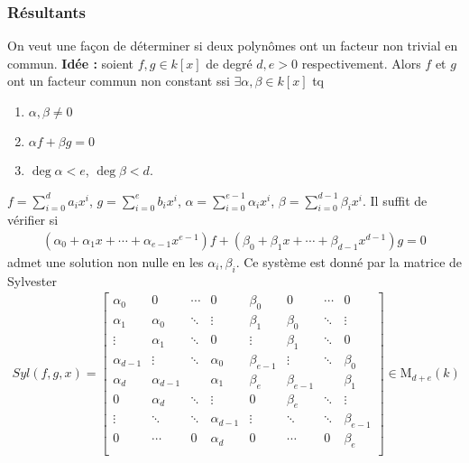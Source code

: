             \subsubsection{Résultants}
                On veut une façon de déterminer si deux polynômes ont un facteur non trivial en commun. \textbf{Idée :} soient $f,g \in k[x]$ de degré $d,e > 0$ respectivement. Alors $f$ et $g$ ont un facteur commun non constant ssi $\exists \alpha, \beta \in k[x]$ tq 
                \begin{enumerate}
                    \item $\alpha, \beta \neq 0$
                    \item $\alpha f + \beta g = 0$
                    \item $\deg \alpha < e$, $\deg \beta < d$.
                \end{enumerate}
                $f = \sum_{i = 0}^d a_ix^i$, $g = \sum_{i = 0}^e b_i x^i$, $\alpha = \sum_{i = 0}^{e-1} \alpha_i x^i$, $\beta = \sum_{i = 0}^{d-1} \beta_i x^i$. Il suffit de vérifier si
                \begin{align*}
                    (\alpha_0 + \alpha_1x + \cdots + \alpha_{e-1}x^{e-1})f + (\beta_0 + \beta_1x + \cdots + \beta_{d-1}x^{d-1})g = 0
                \end{align*}
                admet une solution non nulle en les $\alpha_i, \beta_i$. Ce système est donné par la matrice de Sylvester
                \begin{align*}
                    Syl(f,g,x) =
                    \begin{bmatrix}
                        \alpha_0 & 0 & \cdots & 0 & \beta_0 & 0 & \cdots & 0 \\
                        \alpha_1 & \alpha_0 & \ddots & \vdots & \beta_1 & \beta_0 & \ddots & \vdots \\
                        \vdots & \alpha_1 & \ddots & 0 & \vdots & \beta_1 & \ddots & 0 \\
                        \alpha_{d-1} & \vdots & \ddots & \alpha_0 & \beta_{e-1} & \vdots & \ddots & \beta_0 \\
                        \alpha_d & \alpha_{d-1} & & \alpha_1 & \beta_e & \beta_{e-1} & & \beta_1 \\
                        0 & \alpha_d & \ddots & \vdots & 0 & \beta_e & \ddots & \vdots \\
                        \vdots & \ddots & \ddots & \alpha_{d-1} & \vdots & \ddots & \ddots & \beta_{e-1} \\
                        0 & \cdots & 0 & \alpha_d & 0 & \cdots & 0 & \beta_e \\
                    \end{bmatrix}
                    \in \mathrm{M}_{d+e}(k)
                \end{align*}
